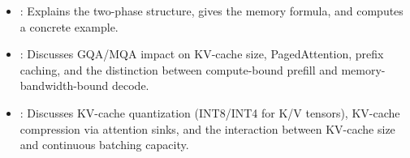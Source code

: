 \begin{interviewq}
\goodgreat
\begin{itemize}
    \item {}: Explains the two-phase structure, gives the memory formula,
          and computes a concrete example.
    \item {}: Discusses GQA/MQA impact on KV-cache size, PagedAttention,
          prefix caching, and the distinction between compute-bound prefill and
          memory-bandwidth-bound decode.
    \item {}: Discusses KV-cache quantization (INT8/INT4 for K/V tensors),
          KV-cache compression via attention sinks, and the interaction between
          KV-cache size and continuous batching capacity.
\end{itemize}

\end{interviewq}

\vspace{0.5em}

